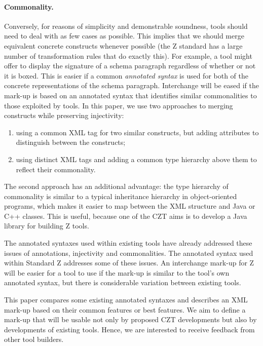 \documentclass{llncs}  %
\begin{document}
\paragraph{Commonality.}
Conversely, for reasons of simplicity and demonstrable soundness, 
tools should need to deal with as few cases as possible.  This implies
that we should merge equivalent concrete constructs whenever possible
(the Z standard has a large number of transformation rules that do
exactly this).
For example, a tool might offer to display the signature 
of a schema paragraph regardless of whether or not it is boxed.
This is easier if a common \textit{annotated syntax} is used
for both of the concrete representations of the schema paragraph.
Interchange will be eased if the mark-up is based on an annotated syntax
that identifies similar commonalities to those exploited by tools.
In this paper, we use two approaches to merging constructs while preserving
injectivity:
\begin{enumerate}
\item using a common XML tag for two similar constructs, but adding
  attributes to distinguish between the constructs; 
\item using distinct XML tags and adding a common type hierarchy above
them to reflect their commonality.
\end{enumerate}
The second approach has an additional advantage: the type hierarchy of
commonality is similar to a typical inheritance hierarchy in
object-oriented programs, which makes it easier to map between the XML
structure and Java or C++ classes.  This is useful, because one of the
CZT aims is to develop a Java library for building Z tools.

\vspace{1.5ex}

The annotated syntaxes used within existing tools have already
addressed these issues of annotations, injectivity and commonalities.
The annotated syntax used within Standard Z addresses some of these issues.
An interchange mark-up for Z will be easier for a tool to use
if the mark-up is similar to the tool's own annotated syntax,
but there is considerable variation between existing tools. 

This paper compares some existing annotated syntaxes and describes an
XML mark-up based on their common features or best features. 
We aim to define a mark-up that will be usable not only by proposed CZT
developments but also by developments of existing tools.  Hence,
we are interested to receive feedback from other tool builders.
\end{document}

